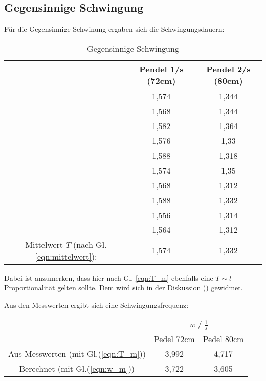 \subsection{Gegensinnige Schwingung}
Für die Gegensinnige Schwinung ergaben sich die Schwingungsdauern:
\begin{table}
    \centering
    \label{tab:Data_gegenphasig}
    \begin{tabular}{c c | c}
        \toprule
        & Pendel 1\;/\;s (72cm) & Pendel 2\;/\;s (80cm)\\
        \midrule
        & 1,574 & 1,344 \\
        & 1,568 & 1,344 \\
        & 1,582 & 1,364 \\
        & 1,576 & 1,33  \\
        & 1,588 & 1,318 \\
        & 1,574 & 1,35  \\
        & 1,568 & 1,312 \\
        & 1,588 & 1,332 \\
        & 1,556 & 1,314 \\
        & 1,564 & 1,312 \\
        \midrule
        Mittelwert $\bar{T}$ (nach Gl. \ref{eqn:mittelwert}): & 1,574 & 1,332 \\
        \bottomrule
    \end{tabular}
    \caption{Gegensinnige Schwingung}
\end{table}
Dabei ist anzumerken, dass hier nach Gl. \ref{eqn:T_m} ebenfalls eine $T \sim l$ Proportionalität
gelten sollte. Dem wird sich in der Diskussion () gewidmet.\newline

Aus den Messwerten ergibt sich eine Schwingungsfrequenz:
\begin{table}
    \centering
    \label{tab:frq_gegens}
    \begin{tabular}{c c c}
        \toprule
        & \multicolumn{2}{c}{$w\;/\;\frac{1}{s}$}\\
        \cmidrule(lr){2-3} 
        & Pedel 72cm & Pedel 80cm\\
        \midrule
        Aus Messwerten (mit Gl.(\ref{eqn:T_m})) & 3,992 & 4,717 \\
        Berechnet (mit Gl.(\ref{eqn:w_m}))      & 3,722 & 3,605 \\
        \bottomrule
    \end{tabular}
\end{table}
\newpage
